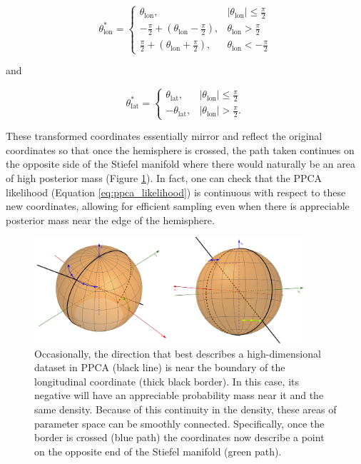 \documentclass[ba]{imsart}
\numberwithin{equation}{section}
\theoremstyle{plain}
\begin{document}
\begin{equation}
\theta_\mathrm{lon}^*
=
\begin{cases}
\theta_\mathrm{lon},& |\theta_\mathrm{lon}| \le \frac{\pi}{2}\\
-\frac{\pi}{2}+(\theta_\mathrm{lon}-\frac{\pi}{2}),& \theta_\mathrm{lon} > \frac{\pi}{2}\\
\frac{\pi}{2}+(\theta_\mathrm{lon}+\frac{\pi}{2}),& \theta_\mathrm{lon} < -\frac{\pi}{2}
\end{cases}
\end{equation}

and

\begin{equation}
\theta_\mathrm{lat}^*
=
\begin{cases}
\theta_\mathrm{lat},& |\theta_\mathrm{lon}| \le \frac{\pi}{2}\\
-\theta_\mathrm{lat},& |\theta_\mathrm{lon}| > \frac{\pi}{2}.
\end{cases}
\end{equation}

\noindent These transformed coordinates essentially mirror and reflect the original coordinates so that once the hemisphere is crossed, the path taken continues on the opposite side of the Stiefel manifold where there would naturally be an area of high posterior mass (Figure \ref{fig:givens_mirroring}). In fact, one can check that the PPCA likelihood (Equation \ref{eq:ppca_likelihood}) is continuous with respect to these new coordinates, allowing for efficient sampling even when there is appreciable posterior mass near the edge of the hemisphere.

\begin{figure}[h]
\centering
\vspace{.1in}
\includegraphics[width=0.9\textwidth]{figures/givens_mirroring.png}
\vspace{.05in}
\caption{Occasionally, the direction that best describes a high-dimensional dataset in PPCA (black line) is near the boundary of the longitudinal coordinate (thick black border). In this case, its negative will have an appreciable probability mass near it and the same density. Because of this continuity in the density, these areas of parameter space can be smoothly connected. Specifically, once the border is crossed (blue path) the coordinates now describe a point on the opposite end of the Stiefel manifold (green path).}
\label{fig:givens_mirroring}
\end{figure}
\end{document}

